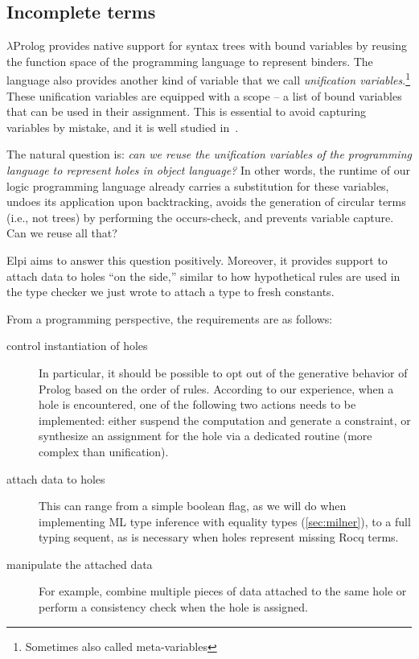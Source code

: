 \documentclass{these-ISSS}
\begin{document}
\subsection{Incomplete terms}


$\lambda$Prolog provides native support for syntax trees with bound variables
by reusing the function space of the programming language to represent
binders. 
The language also provides another kind of variable that we call \emph{unification
variables}.\footnote{Sometimes also called meta-variables} These unification
variables are equipped with a scope -- a list of bound variables that can be
used in their assignment. This is essential to avoid capturing variables by
mistake, and it is well studied in~\cite{miller92jsc}.

The natural question is: \emph{can we reuse the unification variables of the
programming language to represent holes in object language?}
In other words, the runtime of our logic programming language already carries
a substitution for these variables, undoes its application upon
backtracking, avoids the generation of circular terms (i.e., not trees) by
performing the occurs-check, and prevents variable capture. Can we reuse all
that?

Elpi aims to answer this question positively. Moreover, it provides support
to attach data to holes ``on the side,'' similar to how hypothetical rules are
used in the type checker we just wrote to attach a type to fresh constants.

From a programming perspective, the requirements are as follows:

\begin{description}
  \item[control instantiation of holes] In particular, it should be possible
    to opt out of the generative behavior of Prolog based on the order of
    rules. According to our experience, when a hole is encountered, one of
    the following two actions needs to be implemented: either suspend the
    computation and generate a constraint, or synthesize an assignment for
    the hole via a dedicated routine (more complex than unification).
  \item[attach data to holes] This can range from a simple boolean flag, as
    we will do when implementing ML type inference with equality types
    (\cref{sec:milner}), to a full typing sequent, as is necessary when holes
    represent missing Rocq terms.

  \item[manipulate the attached data] For example, combine multiple pieces of
    data attached to the same hole or perform a consistency check when the
    hole is assigned.
\end{description}
\end{document}
